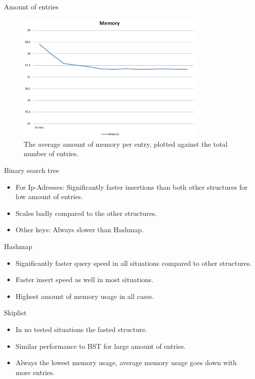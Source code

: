 \documentclass[10pt]{beamer}
\begin{document}
\begin{frame}{Amount of entries}
    \begin{figure}
      \centering
        \includegraphics[width=0.82\textwidth]{SkiplistMemory}
      \caption{The average amount of memory per entry, plotted against the total number of entries.}
    \end{figure}
\end{frame}

\begin{frame}{Binary search tree}
    \begin{itemize}
        \item For Ip-Adresses: Significantly faster insertions than both other structures for low amount of entries.
        \item Scales badly compared to the other structures.
        \item Other keys: Always slower than Hashmap.
    \end{itemize}       
\end{frame}

\begin{frame}{Hashmap}
    \begin{itemize}
        \item Significantly faster query speed in all situations compared to other structures.
        \item Faster insert speed as well in most situations.
        \item Highest amount of memory usage in all cases.
    \end{itemize}       
\end{frame}

\begin{frame}{Skiplist}
    \begin{itemize}
        \item In no tested situations the fasted structure.
        \item Similar performance to BST for large amount of entries.
        \item Always the lowest memory usage, average memory usage goes down with more entries.
    \end{itemize}       
\end{frame}
\end{document}

